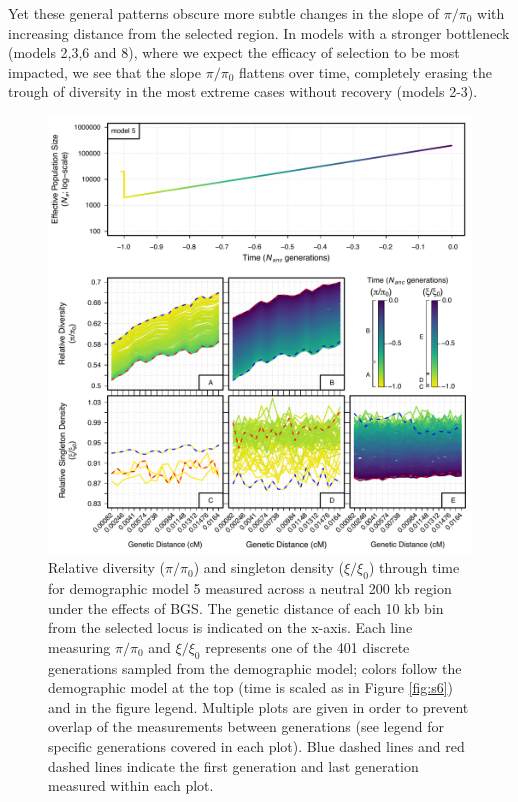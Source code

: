 \documentclass[9pt,twocolumn,twoside]{rilabRxiv}
\begin{document}
Yet these general patterns obscure more subtle changes in the slope of $\pi/\pi_0$ with increasing distance from the selected region.
In models with a stronger bottleneck (models 2,3,6 and 8), where we expect the efficacy of selection to be most impacted, we see that the slope $\pi/\pi_0$ flattens over time, completely erasing the trough of diversity in the most extreme cases without recovery (models 2-3). 


\begin{figure}[]
\includegraphics[width=\linewidth]{figures/FigS13.pdf}
\caption{Relative diversity ($\pi/\pi_0$) and singleton density ($\xi/\xi_0$) through time for demographic model 5 measured across a neutral 200 kb region under the effects of BGS.
The genetic distance of each 10 kb bin from the selected locus is indicated on the x-axis.
Each line measuring $\pi/\pi_0$ and $\xi/\xi_0$ represents one of the 401 discrete generations sampled from the demographic model; colors follow the demographic model at the top (time is scaled as in Figure \ref{fig:s6}) and in the figure legend.
Multiple plots are given in order to prevent overlap of the measurements between generations (see legend for specific generations covered in each plot).
Blue dashed lines and red dashed lines indicate the first generation and last generation measured within each plot.}
\label{fig:200kb}
\end{figure}
\end{document}
